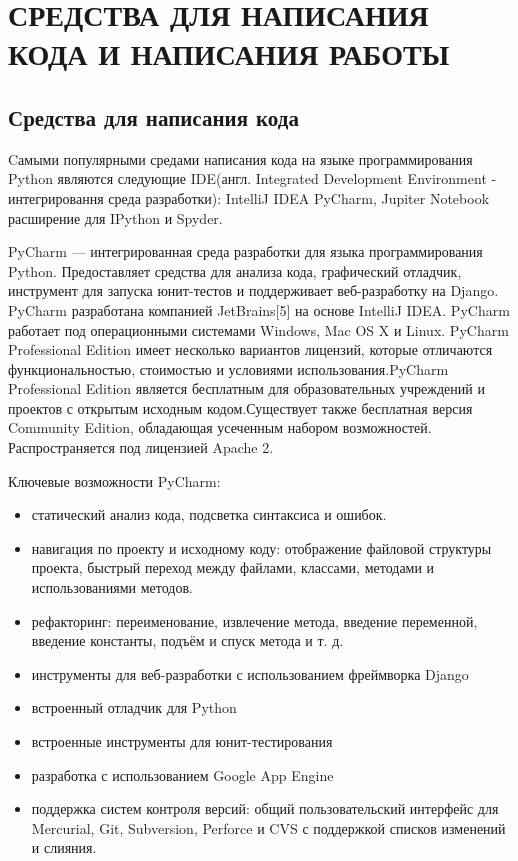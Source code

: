 \newpage
\section{СРЕДСТВА ДЛЯ НАПИСАНИЯ КОДА И НАПИСАНИЯ РАБОТЫ}
\subsection{Средства для написания кода}
Cамыми популярными средами написания кода на языке программирования Python являются следующие IDE(англ. Integrated Development Environment - интегрировання среда разработки): IntelliJ IDEA PyCharm, Jupiter Notebook расширение для IPython и Spyder.

PyCharm — интегрированная среда разработки для языка программирования Python. Предоставляет средства для анализа кода, графический отладчик, инструмент для запуска юнит-тестов и поддерживает веб-разработку на Django. PyCharm разработана компанией JetBrains[5] на основе IntelliJ IDEA. PyCharm работает под операционными системами Windows, Mac OS X и Linux. PyCharm Professional Edition имеет несколько вариантов лицензий, которые отличаются функциональностью, стоимостью и условиями использования.PyCharm Professional Edition является бесплатным для образовательных учреждений и проектов с открытым исходным кодом.Существует также бесплатная версия Community Edition, обладающая усеченным набором возможностей. Распространяется под лицензией Apache 2.

Ключевые возможности PyCharm:
\begin{itemize}
	\item статический анализ кода, подсветка синтаксиса и ошибок.
	\item навигация по проекту и исходному коду: отображение файловой структуры проекта, быстрый переход между файлами, классами, методами и использованиями методов.
	\item рефакторинг: переименование, извлечение метода, введение переменной, введение константы, подъём и спуск метода и т. д.
	\item инструменты для веб-разработки с использованием фреймворка Django
	\item встроенный отладчик для Python
	\item встроенные инструменты для юнит-тестирования
	\item разработка с использованием Google App Engine
	\item поддержка систем контроля версий: общий пользовательский интерфейс для Mercurial, Git, Subversion, Perforce и CVS с поддержкой списков изменений и слияния.
\end{itemize}

